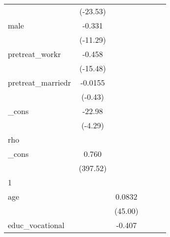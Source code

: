 {\begin{tabular}{l*{5}{c}}
            &    (-23.53)         &                     &                     &                     &                     \\
[1em]
male        &      -0.331\sym{***}&                     &                     &                     &                     \\
            &    (-11.29)         &                     &                     &                     &                     \\
[1em]
pretreat\_workr&      -0.458\sym{***}&                     &                     &                     &                     \\
            &    (-15.48)         &                     &                     &                     &                     \\
[1em]
pretreat\_marriedr&     -0.0155         &                     &                     &                     &                     \\
            &     (-0.43)         &                     &                     &                     &                     \\
[1em]
\_cons      &      -22.98\sym{***}&                     &                     &                     &                     \\
            &     (-4.29)         &                     &                     &                     &                     \\
\hline
rho         &                     &                     &                     &                     &                     \\
\_cons      &       0.760\sym{***}&                     &                     &                     &                     \\
            &    (397.52)         &                     &                     &                     &                     \\
\hline
1           &                     &                     &                     &                     &                     \\
age         &                     &      0.0832\sym{***}&                     &                     &                     \\
            &                     &     (45.00)         &                     &                     &                     \\
[1em]
educ\_vocational&                     &      -0.407\sym{***}&                     &                     &                     \\

\end{tabular}}
